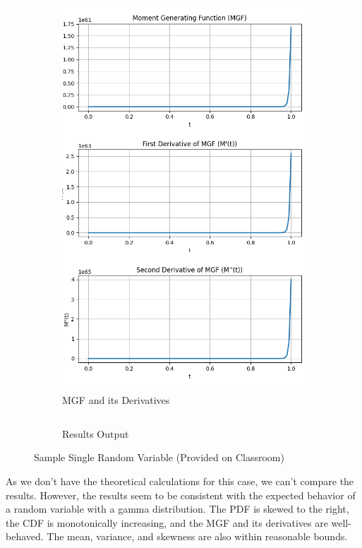 \documentclass{article}
\begin{document}
\begin{figure}[H]
\begin{subfigure}{0.45\textwidth}
    \includegraphics[width=\linewidth]{results/section1/a1(2).png}
    \caption{MGF and its Derivatives}
  \end{subfigure}
  \begin{subfigure}{\textwidth}
    \inputminted{text}{results/section1/a1.txt}
    \caption{Results Output}
  \end{subfigure}
  \caption{Sample Single Random Variable (Provided on Classroom)}
\end{figure}

As we don't have the theoretical calculations for this case, we can't compare the results. However, the results seem to be consistent with the expected behavior of a random variable with a gamma distribution. The PDF is skewed to the right, the CDF is monotonically increasing, and the MGF and its derivatives are well-behaved. The mean, variance, and skewness are also within reasonable bounds.
\end{document}
